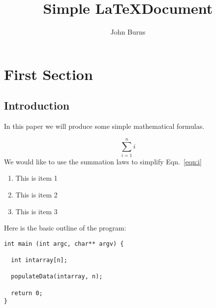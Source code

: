 \documentclass[12pt]{article}
\title{Simple \LaTeX Document}
\date{}
\author{John Burns}
\begin{document}
\maketitle

\section{First Section}
\subsection{Introduction}
In this paper 
we will produce some simple 
mathematical
formulas.

\begin{equation} 
\label{eqn:i}
\sum_{i=1}^n i
\end{equation}
We would like to use the summation laws 
to simplify Eqn.~\ref{eqn:i}

\begin{enumerate}
\item This is item 1
\item This is item 2
\item This is item 3
\end{enumerate}

Here is the basic outline of the program:

\begin{verbatim}
int main (int argc, char** argv) {

  int intarray[n];

  populateData(intarray, n);

  return 0;
}
\end{verbatim}
\end{document}
